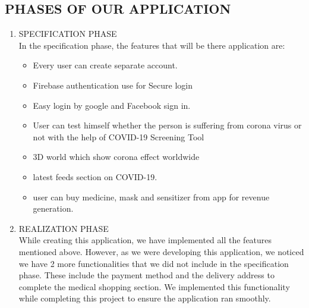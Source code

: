 \subsection{PHASES OF OUR APPLICATION}
\begin{enumerate}
    \item SPECIFICATION PHASE\\
In the specification phase, the features that will be there application are:
\begin{itemize}
    \item Every user can create separate account.
    \item Firebase authentication use for Secure login
    \item Easy login by google and Facebook sign in.
    \item User can test himself whether the person is suffering from corona virus or not with the help of COVID-19 Screening Tool
    \item 3D world which show corona effect worldwide
    \item latest feeds section on COVID-19.
    \item user can buy medicine, mask and sensitizer from app for revenue generation.
\end{itemize}
\item REALIZATION PHASE\\
While creating this application, we have implemented all the features mentioned above. However, as we were developing this application, we noticed we have 2 more functionalities that we did not include in the specification phase. These include the payment method and the delivery address to complete the medical shopping section. We implemented this functionality while completing this project to ensure the application ran smoothly.
\end{enumerate}

